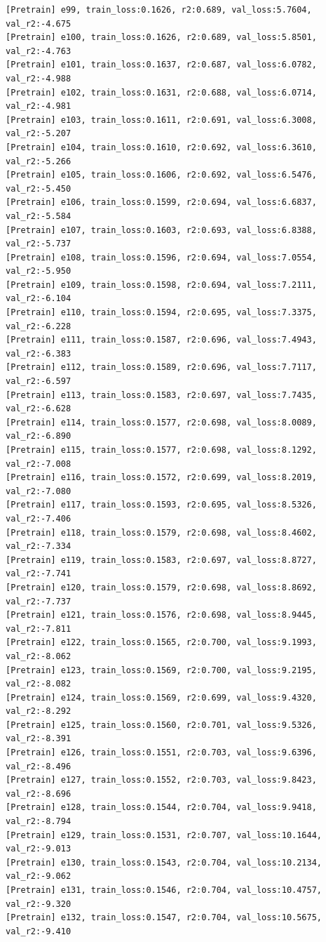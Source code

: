 \documentclass[a4paper, 12pt]{article}
\begin{document}
\begin{lstlisting}
[Pretrain] e99, train_loss:0.1626, r2:0.689, val_loss:5.7604, val_r2:-4.675
[Pretrain] e100, train_loss:0.1626, r2:0.689, val_loss:5.8501, val_r2:-4.763
[Pretrain] e101, train_loss:0.1637, r2:0.687, val_loss:6.0782, val_r2:-4.988
[Pretrain] e102, train_loss:0.1631, r2:0.688, val_loss:6.0714, val_r2:-4.981
[Pretrain] e103, train_loss:0.1611, r2:0.691, val_loss:6.3008, val_r2:-5.207
[Pretrain] e104, train_loss:0.1610, r2:0.692, val_loss:6.3610, val_r2:-5.266
[Pretrain] e105, train_loss:0.1606, r2:0.692, val_loss:6.5476, val_r2:-5.450
[Pretrain] e106, train_loss:0.1599, r2:0.694, val_loss:6.6837, val_r2:-5.584
[Pretrain] e107, train_loss:0.1603, r2:0.693, val_loss:6.8388, val_r2:-5.737
[Pretrain] e108, train_loss:0.1596, r2:0.694, val_loss:7.0554, val_r2:-5.950
[Pretrain] e109, train_loss:0.1598, r2:0.694, val_loss:7.2111, val_r2:-6.104
[Pretrain] e110, train_loss:0.1594, r2:0.695, val_loss:7.3375, val_r2:-6.228
[Pretrain] e111, train_loss:0.1587, r2:0.696, val_loss:7.4943, val_r2:-6.383
[Pretrain] e112, train_loss:0.1589, r2:0.696, val_loss:7.7117, val_r2:-6.597
[Pretrain] e113, train_loss:0.1583, r2:0.697, val_loss:7.7435, val_r2:-6.628
[Pretrain] e114, train_loss:0.1577, r2:0.698, val_loss:8.0089, val_r2:-6.890
[Pretrain] e115, train_loss:0.1577, r2:0.698, val_loss:8.1292, val_r2:-7.008
[Pretrain] e116, train_loss:0.1572, r2:0.699, val_loss:8.2019, val_r2:-7.080
[Pretrain] e117, train_loss:0.1593, r2:0.695, val_loss:8.5326, val_r2:-7.406
[Pretrain] e118, train_loss:0.1579, r2:0.698, val_loss:8.4602, val_r2:-7.334
[Pretrain] e119, train_loss:0.1583, r2:0.697, val_loss:8.8727, val_r2:-7.741
[Pretrain] e120, train_loss:0.1579, r2:0.698, val_loss:8.8692, val_r2:-7.737
[Pretrain] e121, train_loss:0.1576, r2:0.698, val_loss:8.9445, val_r2:-7.811
[Pretrain] e122, train_loss:0.1565, r2:0.700, val_loss:9.1993, val_r2:-8.062
[Pretrain] e123, train_loss:0.1569, r2:0.700, val_loss:9.2195, val_r2:-8.082
[Pretrain] e124, train_loss:0.1569, r2:0.699, val_loss:9.4320, val_r2:-8.292
[Pretrain] e125, train_loss:0.1560, r2:0.701, val_loss:9.5326, val_r2:-8.391
[Pretrain] e126, train_loss:0.1551, r2:0.703, val_loss:9.6396, val_r2:-8.496
[Pretrain] e127, train_loss:0.1552, r2:0.703, val_loss:9.8423, val_r2:-8.696
[Pretrain] e128, train_loss:0.1544, r2:0.704, val_loss:9.9418, val_r2:-8.794
[Pretrain] e129, train_loss:0.1531, r2:0.707, val_loss:10.1644, val_r2:-9.013
[Pretrain] e130, train_loss:0.1543, r2:0.704, val_loss:10.2134, val_r2:-9.062
[Pretrain] e131, train_loss:0.1546, r2:0.704, val_loss:10.4757, val_r2:-9.320
[Pretrain] e132, train_loss:0.1547, r2:0.704, val_loss:10.5675, val_r2:-9.410

\end{lstlisting}
\end{document}
